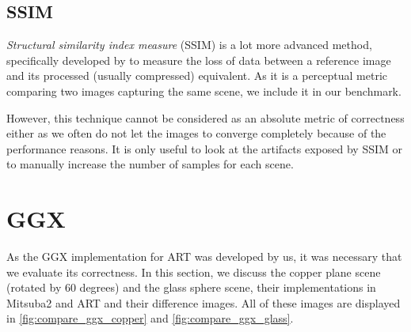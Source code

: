 \subsection{SSIM}
\emph{Structural similarity index measure} (SSIM) is a lot more advanced method, specifically developed by \citet{wang2004image} to measure the loss of data between a reference image and its processed (usually compressed) equivalent. As it is a perceptual metric comparing two images capturing the same scene, we include it in our benchmark.

However, this technique cannot be considered as an absolute metric of correctness either as we often do not let the images to converge completely because of the performance reasons. It is only useful to look at the artifacts exposed by SSIM or to manually increase the number of samples for each scene. 

\section{GGX}

As the GGX implementation for ART was developed by us, it was necessary that we evaluate its correctness. In this section, we discuss the copper plane scene (rotated by 60 degrees) and the glass sphere scene, their implementations in Mitsuba2 and ART and their difference images. All of these images are displayed in \autoref{fig:compare_ggx_copper} and \autoref{fig:compare_ggx_glass}.

